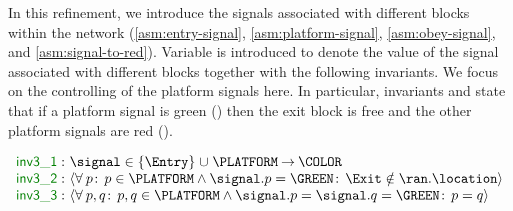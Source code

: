 \documentclass{llncs}
\begin{document}
In this refinement, we introduce the signals associated with different
blocks within the network (\ref{asm:entry-signal},
\ref{asm:platform-signal}, \ref{asm:obey-signal}, and
\ref{asm:signal-to-red}).  Variable \signal is introduced to denote
the value of the signal associated with different blocks together with
the following invariants.  We focus on the controlling of the platform
signals here.  In particular, invariants  and
 state that if a platform signal is green (\GREEN) then
the exit block is free and the other platform signals are red (\RED).
  \begin{Bcode}[\footnotesize]
    $ \invariants[false]{ \Binv{inv3\_1}: & \signal \in \{\Entry\}
      \bunion \PLATFORM \tfun
      \COLOR \\
      \Binv{inv3\_2}: & \qforall{p}{p \in \PLATFORM \land \signal.p =
        \GREEN}{\Exit \notin \ran.\location} \\
      \Binv{inv3\_3}: & \qforall{p,q}{p, q \in \PLATFORM \land
        \signal.p = \signal.q = \GREEN}{p = q} } $
  \end{Bcode}
\end{document}
